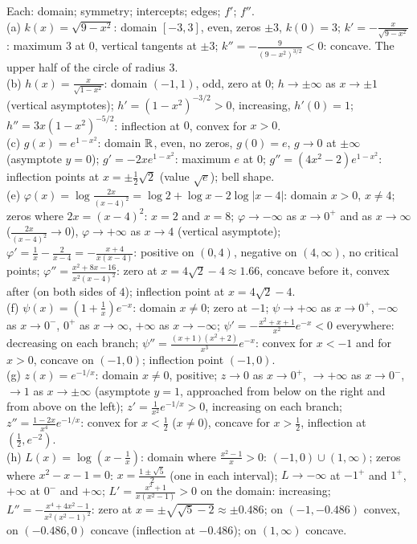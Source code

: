  Each: domain; symmetry; intercepts; edges; $f'$; $f''$.\\
(a) $k(x)=\sqrt{9-x^2}$: domain $[-3,3]$, even, zeros $\pm3$, $k(0)=3$; $k'=-\frac x{\sqrt{9-x^2}}$: maximum $3$ at $0$, vertical tangents at $\pm3$; $k''=-\frac9{(9-x^2)^{3/2}}<0$: concave. The upper half of the circle of radius $3$.\\
(b) $h(x)=\frac x{\sqrt{1-x^2}}$: domain $(-1,1)$, odd, zero at $0$; $h\to\pm\infty$ as $x\to\pm1$ (vertical asymptotes); $h'=(1-x^2)^{-3/2}>0$, increasing, $h'(0)=1$; $h''=3x(1-x^2)^{-5/2}$: inflection at $0$, convex for $x>0$.\\
(c) $g(x)=e^{1-x^2}$: domain $\mathbb{R}$, even, no zeros, $g(0)=e$, $g\to0$ at $\pm\infty$ (asymptote $y=0$); $g'=-2xe^{1-x^2}$: maximum $e$ at $0$; $g''=(4x^2-2)e^{1-x^2}$: inflection points at $x=\pm\frac12\sqrt2$ (value $\sqrt e$); bell shape.\\
(e) $\varphi(x)=\log\frac{2x}{(x-4)^2}=\log2+\log x-2\log|x-4|$: domain $x>0$, $x\ne4$; zeros where $2x=(x-4)^2$: $x=2$ and $x=8$; $\varphi\to-\infty$ as $x\to0^+$ and as $x\to\infty$ ($\frac{2x}{(x-4)^2}\to0$), $\varphi\to+\infty$ as $x\to4$ (vertical asymptote); $\varphi'=\frac1x-\frac2{x-4}=-\frac{x+4}{x(x-4)}$: positive on $(0,4)$, negative on $(4,\infty)$, no critical points; $\varphi''=\frac{x^2+8x-16}{x^2(x-4)^2}$: zero at $x=4\sqrt2-4\approx1.66$, concave before it, convex after (on both sides of $4$); inflection point at $x=4\sqrt2-4$.\\
(f) $\psi(x)=(1+\frac1x)e^{-x}$: domain $x\ne0$; zero at $-1$; $\psi\to+\infty$ as $x\to0^+$, $-\infty$ as $x\to0^-$, $0^+$ as $x\to\infty$, $+\infty$ as $x\to-\infty$; $\psi'=-\frac{x^2+x+1}{x^2}e^{-x}<0$ everywhere: decreasing on each branch; $\psi''=\frac{(x+1)(x^2+2)}{x^3}e^{-x}$: convex for $x<-1$ and for $x>0$, concave on $(-1,0)$; inflection point $(-1,0)$.\\
(g) $z(x)=e^{-1/x}$: domain $x\ne0$, positive; $z\to0$ as $x\to0^+$, $\to+\infty$ as $x\to0^-$, $\to1$ as $x\to\pm\infty$ (asymptote $y=1$, approached from below on the right and from above on the left); $z'=\frac1{x^2}e^{-1/x}>0$, increasing on each branch; $z''=\frac{1-2x}{x^4}e^{-1/x}$: convex for $x<\frac12$ ($x\ne0$), concave for $x>\frac12$, inflection at $(\frac12,e^{-2})$.\\
(h) $L(x)=\log(x-\frac1x)$: domain where $\frac{x^2-1}x>0$: $(-1,0)\cup(1,\infty)$; zeros where $x^2-x-1=0$: $x=\frac{1\pm\sqrt5}2$ (one in each interval); $L\to-\infty$ at $-1^+$ and $1^+$, $+\infty$ at $0^-$ and $+\infty$; $L'=\frac{x^2+1}{x(x^2-1)}>0$ on the domain: increasing; $L''=-\frac{x^4+4x^2-1}{x^2(x^2-1)^2}$: zero at $x=\pm\sqrt{\sqrt5-2}\approx\pm0.486$; on $(-1,-0.486)$ convex, on $(-0.486,0)$ concave (inflection at $-0.486$); on $(1,\infty)$ concave.\\
